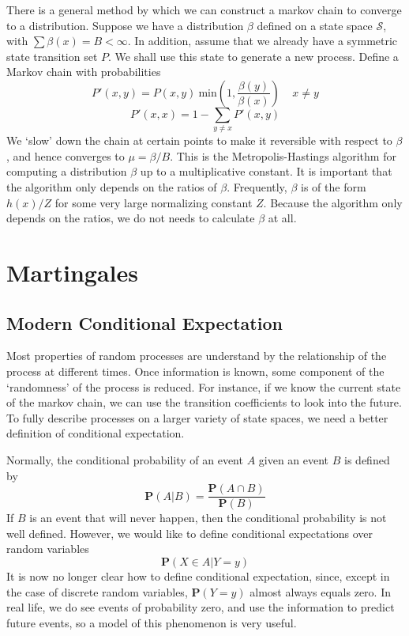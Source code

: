 There is a general method by which we can construct a markov chain to converge to a distribution. Suppose we have a distribution $\beta$ defined on a state space $\mathcal{S}$, with $\sum \beta(x) = B < \infty$. In addition, assume that we already have a symmetric state transition set $P$. We shall use this state to generate a new process. Define a Markov chain with probabilities
%
\[ P'(x,y) = P(x,y)\ \text{min}(1, \frac{\beta(y)}{\beta(x)})\ \ \ \ \ x \neq y \]
%
\[ P'(x,x) = 1 - \sum_{y \neq x} P'(x,y) \]
%
We `slow' down the chain at certain points to make it reversible with respect to $\beta$, and hence converges to $\mu = \beta/B$. This is the Metropolis-Hastings algorithm for computing a distribution $\beta$ up to a multiplicative constant. It is important that the algorithm only depends on the ratios of $\beta$. Frequently, $\beta$ is of the form $h(x)/Z$ for some very large normalizing constant $Z$. Because the algorithm only depends on the ratios, we do not needs to calculate $\beta$ at all.





\chapter{Martingales}

\section{Modern Conditional Expectation}

Most properties of random processes are understand by the relationship of the process at different times. Once information is known, some component of the `randomness' of the process is reduced. For instance, if we know the current state of the markov chain, we can use the transition coefficients to look into the future. To fully describe processes on a larger variety of state spaces, we need a better definition of conditional expectation.

Normally, the conditional probability of an event $A$ given an event $B$ is defined by
%
\[ \mathbf{P}(A | B) = \frac{\mathbf{P}(A \cap B)}{\mathbf{P}(B)} \]
%
If $B$ is an event that will never happen, then the conditional probability is not well defined. However, we would like to define conditional expectations over random variables
%
\[ \mathbf{P}(X \in A | Y = y) \]
%
It is now no longer clear how to define conditional expectation, since, except in the case of discrete random variables, $\mathbf{P}(Y = y)$ almost always equals zero. In real life, we do see events of probability zero, and use the information to predict future events, so a model of this phenomenon is very useful.

